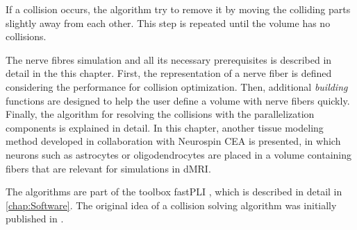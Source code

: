 If a collision occurs, the algorithm try to remove it by moving the colliding parts slightly away from each other.
This step is repeated until the volume has no collisions.
\par
%
The nerve fibres simulation and all its necessary prerequisites is described in detail in the this chapter.
First, the representation of a nerve fiber is defined considering the performance for collision optimization.
Then, additional \textit{building} functions are designed to help the user define a volume with nerve fibers quickly.
Finally, the algorithm for resolving the collisions with the parallelization components is explained in detail.
In this chapter, another tissue modeling method developed in collaboration with Neurospin \ac{CEA} is presented, in which neurons such as astrocytes or oligodendrocytes are placed in a volume containing fibers that are relevant for simulations in \ac{dMRI}.
\par
%
The algorithms are part of the toolbox \ac{fastPLI} \cite{Matuschke2019, Matuschke2021}, which is described in detail in \cref{chap:Software}.
The original idea of a collision solving algorithm was initially published in \cite{Matuschke2019}.
%
%
%
